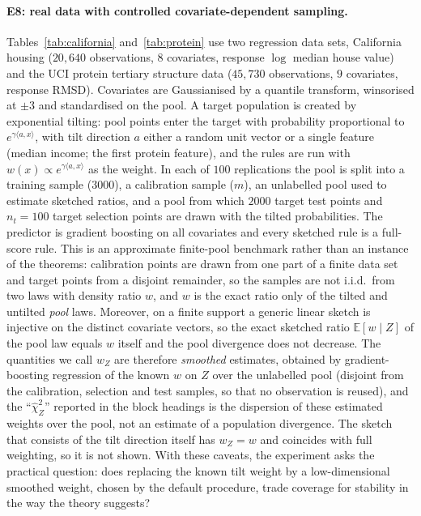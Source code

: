\documentclass[11pt,a4paper]{article}
\newcommand{\E}{\mathbb{E}}
\theoremstyle{plain}
\theoremstyle{definition}
\theoremstyle{remark}
\begin{document}
\FloatBarrier
\paragraph{E8: real data with controlled covariate-dependent sampling.}
Tables~\ref{tab:california} and~\ref{tab:protein} use two regression data sets, California housing ($20{,}640$ observations, $8$ covariates, response $\log$ median house value) and the UCI protein tertiary structure data ($45{,}730$ observations, $9$ covariates, response RMSD). Covariates are Gaussianised by a quantile transform, winsorised at $\pm3$ and standardised on the pool. A target population is created by exponential tilting: pool points enter the target with probability proportional to $e^{\gamma\langle a,x\rangle}$, with tilt direction $a$ either a random unit vector or a single feature (median income; the first protein feature), and the rules are run with $w(x)\propto e^{\gamma\langle a,x\rangle}$ as the weight. In each of $100$ replications the pool is split into a training sample ($3000$), a calibration sample ($m$), an unlabelled pool used to estimate sketched ratios, and a pool from which $2000$ target test points and $n_t=100$ target selection points are drawn with the tilted probabilities. The predictor is gradient boosting on all covariates and every sketched rule is a full-score rule. This is an approximate finite-pool benchmark rather than an instance of the theorems: calibration points are drawn from one part of a finite data set and target points from a disjoint remainder, so the samples are not i.i.d.\ from two laws with density ratio $w$, and $w$ is the exact ratio only of the tilted and untilted \emph{pool} laws. Moreover, on a finite support a generic linear sketch is injective on the distinct covariate vectors, so the exact sketched ratio $\E[w\mid Z]$ of the pool law equals $w$ itself and the pool divergence does not decrease. The quantities we call $w_Z$ are therefore \emph{smoothed} estimates, obtained by gradient-boosting regression of the known $w$ on $Z$ over the unlabelled pool (disjoint from the calibration, selection and test samples, so that no observation is reused), and the ``$\hat\chi^2_Z$'' reported in the block headings is the dispersion of these estimated weights over the pool, not an estimate of a population divergence. The sketch that consists of the tilt direction itself has $w_Z=w$ and coincides with full weighting, so it is not shown. With these caveats, the experiment asks the practical question: does replacing the known tilt weight by a low-dimensional smoothed weight, chosen by the default procedure, trade coverage for stability in the way the theory suggests?
\end{document}
